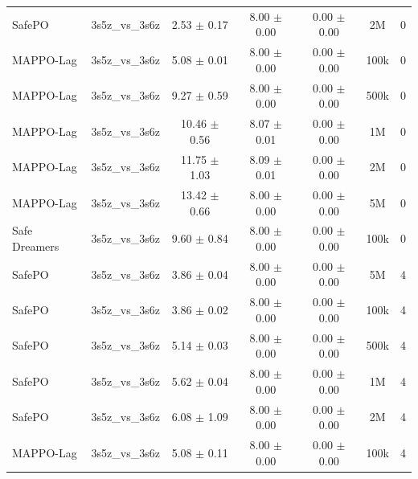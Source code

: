 \documentclass{article}
\begin{document}
\begin{longtable}{lcccccc}
SafePO & 3s5z\_vs\_3s6z & \textcolor{green!60!black}{2.53 $\pm$ 0.17} & \textcolor{green!60!black}{8.00 $\pm$ 0.00} & \textcolor{green!60!black}{0.00 $\pm$ 0.00} & 2M & 0 \\
MAPPO-Lag & 3s5z\_vs\_3s6z & \textcolor{green!60!black}{5.08 $\pm$ 0.01} & \textcolor{green!60!black}{8.00 $\pm$ 0.00} & \textcolor{green!60!black}{0.00 $\pm$ 0.00} & 100k & 0 \\
MAPPO-Lag & 3s5z\_vs\_3s6z & \textcolor{green!60!black}{9.27 $\pm$ 0.59} & \textcolor{green!60!black}{8.00 $\pm$ 0.00} & \textcolor{green!60!black}{0.00 $\pm$ 0.00} & 500k & 0 \\
MAPPO-Lag & 3s5z\_vs\_3s6z & \textcolor{red!70!black}{10.46 $\pm$ 0.56} & \textcolor{green!60!black}{8.07 $\pm$ 0.01} & \textcolor{green!60!black}{0.00 $\pm$ 0.00} & 1M & 0 \\
MAPPO-Lag & 3s5z\_vs\_3s6z & \textcolor{red!70!black}{11.75 $\pm$ 1.03} & \textcolor{green!60!black}{8.09 $\pm$ 0.01} & \textcolor{green!60!black}{0.00 $\pm$ 0.00} & 2M & 0 \\
MAPPO-Lag & 3s5z\_vs\_3s6z & \textcolor{red!70!black}{13.42 $\pm$ 0.66} & \textcolor{green!60!black}{8.00 $\pm$ 0.00} & \textcolor{green!60!black}{0.00 $\pm$ 0.00} & 5M & 0 \\
Safe Dreamers & 3s5z\_vs\_3s6z & 9.60 $\pm$ 0.84 & 8.00 $\pm$ 0.00 & 0.00 $\pm$ 0.00 & 100k & 0 \\
\midrule
SafePO & 3s5z\_vs\_3s6z & \textcolor{green!60!black}{3.86 $\pm$ 0.04} & \textcolor{green!60!black}{8.00 $\pm$ 0.00} & \textcolor{green!60!black}{0.00 $\pm$ 0.00} & 5M & 4 \\
SafePO & 3s5z\_vs\_3s6z & \textcolor{green!60!black}{3.86 $\pm$ 0.02} & \textcolor{green!60!black}{8.00 $\pm$ 0.00} & \textcolor{green!60!black}{0.00 $\pm$ 0.00} & 100k & 4 \\
SafePO & 3s5z\_vs\_3s6z & \textcolor{green!60!black}{5.14 $\pm$ 0.03} & \textcolor{green!60!black}{8.00 $\pm$ 0.00} & \textcolor{green!60!black}{0.00 $\pm$ 0.00} & 500k & 4 \\
SafePO & 3s5z\_vs\_3s6z & \textcolor{green!60!black}{5.62 $\pm$ 0.04} & \textcolor{green!60!black}{8.00 $\pm$ 0.00} & \textcolor{green!60!black}{0.00 $\pm$ 0.00} & 1M & 4 \\
SafePO & 3s5z\_vs\_3s6z & \textcolor{green!60!black}{6.08 $\pm$ 1.09} & \textcolor{green!60!black}{8.00 $\pm$ 0.00} & \textcolor{green!60!black}{0.00 $\pm$ 0.00} & 2M & 4 \\
MAPPO-Lag & 3s5z\_vs\_3s6z & \textcolor{green!60!black}{5.08 $\pm$ 0.11} & \textcolor{green!60!black}{8.00 $\pm$ 0.00} & \textcolor{green!60!black}{0.00 $\pm$ 0.00} & 100k & 4 \\

\end{longtable}
\end{document}

